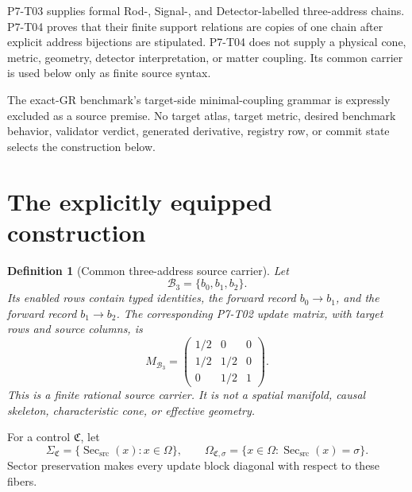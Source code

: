 \documentclass[11pt]{article}
\newtheorem{definition}{Definition}
\newcommand{\Sec}{\operatorname{Sec}_{\mathrm{src}}}
\newcommand{\Control}{\mathfrak C}
\newcommand{\Carrier}{\mathcal B_3}
\begin{document}
P7-T03 supplies formal Rod-, Signal-, and Detector-labelled three-address
chains.  P7-T04 proves that their finite support relations are copies of
one chain after explicit address bijections are stipulated.  P7-T04 does
not supply a physical cone, metric, geometry, detector interpretation, or
matter coupling.  Its common carrier is used below only as finite source
syntax.

The exact-GR benchmark's target-side minimal-coupling grammar is expressly
excluded as a source premise.  No target atlas, target metric, desired
benchmark behavior, validator verdict, generated derivative, registry row,
or commit state selects the construction below.

\section{The explicitly equipped construction}

\begin{definition}[Common three-address source carrier]
Let
\[
 \Carrier=\{b_0,b_1,b_2\}.
\]
Its enabled rows contain typed identities, the forward record
\(b_0\to b_1\), and the forward record \(b_1\to b_2\).  The corresponding
P7-T02 update matrix, with target rows and source columns, is
\begin{equation}
 M_{\Carrier}=
 \begin{pmatrix}
  1/2&0&0\\
  1/2&1/2&0\\
  0&1/2&1
 \end{pmatrix}.
 \label{eq:carrier-matrix}
\end{equation}
This is a finite rational source carrier.  It is not a spatial manifold,
causal skeleton, characteristic cone, or effective geometry.
\end{definition}

For a control \(\Control\), let
\[
 \Sigma_{\Control}=\{\Sec(x):x\in\Omega\},
 \qquad
 \Omega_{\Control,\sigma}
 =\{x\in\Omega:\Sec(x)=\sigma\}.
\]
Sector preservation makes every update block diagonal with respect to these
fibers.
\end{document}
